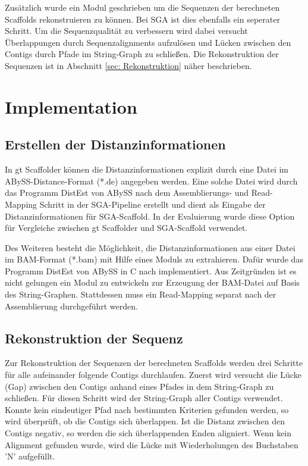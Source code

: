 \documentclass[a4paper,10pt,parskip]{scrartcl}
\begin{document}
Zusätzlich wurde ein Modul geschrieben um die Sequenzen der
berechneten Scaffolds rekonstruieren zu können. Bei SGA ist dies
ebenfalls ein seperater Schritt. Um die Sequenzqualität zu verbessern
wird dabei versucht Überlappungen durch Sequenzalignments aufzulösen
und Lücken zwischen den Contigs durch Pfade im String-Graph zu
schließen. Die Rekonstruktion der Sequenzen ist in Abschnitt \ref{sec:
  Rekonstruktion} näher beschrieben.

\section{Implementation}
\label{sec: Implementation}
\subsection{Erstellen der Distanzinformationen}
In gt Scaffolder können die Distanzinformationen explizit durch eine
Datei im ABySS-Distance-Format (*.de) angegeben werden. Eine solche
Datei wird durch das Programm DistEst von ABySS nach dem Assemblierungs-
und Read-Mapping Schritt in der SGA-Pipeline erstellt und dient als
Eingabe der Distanzinformationen für SGA-Scaffold. In der Evaluierung wurde diese Option für Vergleiche zwischen gt Scaffolder und SGA-Scaffold
verwendet.

Des Weiteren besteht die Möglichkeit, die Distanzinformationen aus
einer Datei im BAM-Format (*.bam) mit Hilfe eines Moduls zu
extrahieren. Dafür wurde das Programm DistEst von ABySS in C nach
implementiert. Aus Zeitgründen ist es nicht gelungen ein Modul zu
entwickeln zur Erzeugung der BAM-Datei auf Basis des String-Graphen. Stattdessen muss ein Read-Mapping separat nach der Assemblierung
durchgeführt werden.

\subsection{Rekonstruktion der Sequenz}
\label{sec: Rekonstruktion}
Zur Rekonstruktion der Sequenzen der berechneten Scaffolds werden drei
Schritte für alle aufeinander folgende Contigs durchlaufen. Zuerst
wird versucht die Lücke (Gap) zwischen den Contigs anhand eines Pfades
in dem String-Graph zu schließen. Für diesen Schritt wird der
String-Graph aller Contigs verwendet. Konnte kein eindeutiger Pfad nach
bestimmten Kriterien gefunden werden, so wird überprüft, ob die
Contigs sich überlappen. Ist die Distanz zwischen den Contigs negativ,
so werden die sich überlappenden Enden aligniert. Wenn kein Alignment
gefunden wurde, wird die Lücke mit Wiederholungen des Buchstaben 'N'
aufgefüllt.
\end{document}
